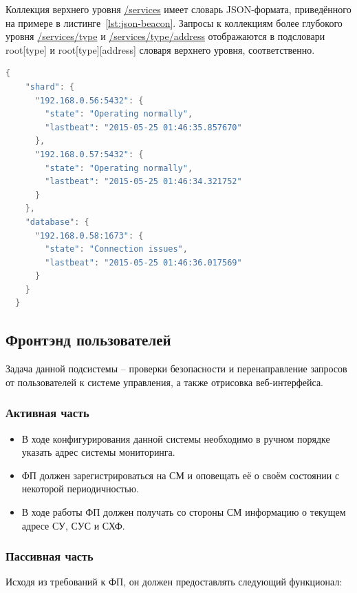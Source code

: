 \documentclass[a4paper,12pt]{report}
\numberwithin{equation}{section}
\begin{document}
  Коллекция верхнего уровня \url{/services} имеет словарь JSON-формата, приведённого на примере в листинге~\ref{lst:json-beacon}. Запросы к коллекциям более глубокого уровня \url{/services/type} и \url{/services/type/address} отображаются в подсловари root[type] и root[type][address] словаря верхнего уровня, соответственно.
  
  \begin{lstlisting}[float={h},language=Java,caption={Пример JSON-представления коллекции верхнего уровня сервиса мониторинга},label=lst:json-beacon]
  {
    "shard": {
      "192.168.0.56:5432": {
        "state": "Operating normally", 
        "lastbeat": "2015-05-25 01:46:35.857670"
      },
      "192.168.0.57:5432": {
        "state": "Operating normally",
        "lastbeat": "2015-05-25 01:46:34.321752"
      }
    },
    "database": {
      "192.168.0.58:1673": {
        "state": "Connection issues",
        "lastbeat": "2015-05-25 01:46:36.017569"
      }
    }
  }
  \end{lstlisting}
  
  \subsection{Фронтэнд пользователей}
  Задача данной подсистемы -- проверки безопасности и перенаправление запросов от пользователей к системе управления, а также отрисовка веб-интерфейса.
  
  \subsubsection{Активная часть}
  \begin{itemize}
    \item В ходе конфигурирования данной системы необходимо в ручном порядке указать адрес системы мониторинга.
    \item ФП должен зарегистрироваться на СМ и оповещать её о своём состоянии с некоторой периодичностью.
    \item В ходе работы ФП должен получать со стороны СМ информацию о текущем адресе СУ, СУС и СХФ.
  \end{itemize}
  
  \subsubsection{Пассивная часть}
  Исходя из требований к ФП, он должен предоставлять следующий функционал:
  
\end{document}
